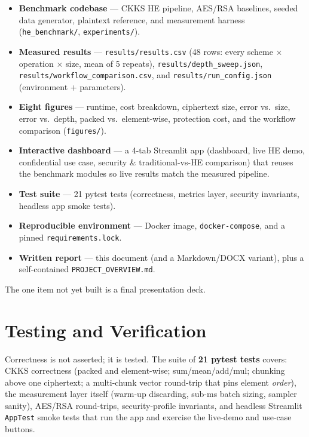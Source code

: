 \documentclass[11pt,a4paper]{article}
\begin{document}
\begin{itemize}[leftmargin=1.4em,itemsep=1pt]
  \item \textbf{Benchmark codebase} --- CKKS HE pipeline, AES/RSA baselines,
    seeded data generator, plaintext reference, and measurement harness
    (\texttt{he\_benchmark/}, \texttt{experiments/}).
  \item \textbf{Measured results} --- \texttt{results/results.csv}
    (48 rows: every scheme $\times$ operation $\times$ size, mean of 5 repeats),
    \texttt{results/depth\_sweep.json}, \texttt{results/workflow\_comparison.csv},
    and \texttt{results/run\_config.json} (environment + parameters).
  \item \textbf{Eight figures} --- runtime, cost breakdown, ciphertext size,
    error vs.\ size, error vs.\ depth, packed vs.\ element-wise, protection cost,
    and the workflow comparison (\texttt{figures/}).
  \item \textbf{Interactive dashboard} --- a 4-tab Streamlit app (dashboard,
    live HE demo, confidential use case, security \& traditional-vs-HE
    comparison) that reuses the benchmark modules so live results match the
    measured pipeline.
  \item \textbf{Test suite} --- 21 pytest tests (correctness, metrics layer,
    security invariants, headless app smoke tests).
  \item \textbf{Reproducible environment} --- Docker image, \texttt{docker-compose},
    and a pinned \texttt{requirements.lock}.
  \item \textbf{Written report} --- this document (and a Markdown/DOCX variant),
    plus a self-contained \texttt{PROJECT\_OVERVIEW.md}.
\end{itemize}

The one item not yet built is a final presentation deck.

\section{Testing and Verification}

Correctness is not asserted; it is tested. The suite of \textbf{21 pytest tests}
covers: CKKS correctness (packed and element-wise; sum/mean/add/mul; chunking
above one ciphertext; a multi-chunk vector round-trip that pins element
\emph{order}), the measurement layer itself (warm-up discarding, sub-ms batch
sizing, sampler sanity), AES/RSA round-trips, security-profile invariants, and
headless Streamlit \texttt{AppTest} smoke tests that run the app and exercise the
live-demo and use-case buttons.
\end{document}
